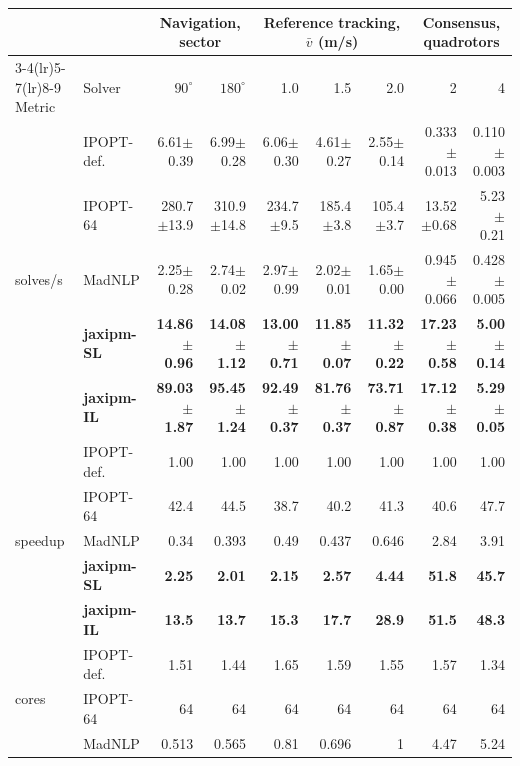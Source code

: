 \begin{table}[p]
\centering\setlength{\tabcolsep}{1.7pt}\renewcommand{\arraystretch}{0.94}
{\scriptsize
\begin{tabular}{@{}l l r r r r r r r@{}}
\toprule
& & \multicolumn{2}{c}{Navigation, sector} & \multicolumn{3}{c}{Reference tracking, $\bar{v}$ (m/s)} & \multicolumn{2}{c}{Consensus, quadrotors} \\
\cmidrule(lr){3-4}\cmidrule(lr){5-7}\cmidrule(lr){8-9}
Metric & Solver & $90^\circ$ & $180^\circ$ & 1.0 & 1.5 & 2.0 & 2 & 4 \\
\midrule
\multirow{5}{*}{solves/s} & IPOPT-def. & 6.61$\pm$0.39 & 6.99$\pm$0.28 & 6.06$\pm$0.30 & 4.61$\pm$0.27 & 2.55$\pm$0.14 & 0.333$\pm$0.013 & 0.110$\pm$0.003 \\
 & IPOPT-64 & 280.7$\pm$13.9 & 310.9$\pm$14.8 & 234.7$\pm$9.5 & 185.4$\pm$3.8 & 105.4$\pm$3.7 & 13.52$\pm$0.68 & 5.23$\pm$0.21 \\
 & MadNLP & 2.25$\pm$0.28 & 2.74$\pm$0.02 & 2.97$\pm$0.99 & 2.02$\pm$0.01 & 1.65$\pm$0.00 & 0.945$\pm$0.066 & 0.428$\pm$0.005 \\
 & \textbf{jaxipm-SL} & \textbf{14.86$\pm$0.96} & \textbf{14.08$\pm$1.12} & \textbf{13.00$\pm$0.71} & \textbf{11.85$\pm$0.07} & \textbf{11.32$\pm$0.22} & \textbf{17.23$\pm$0.58} & \textbf{5.00$\pm$0.14} \\
 & \textbf{jaxipm-IL} & \textbf{89.03$\pm$1.87} & \textbf{95.45$\pm$1.24} & \textbf{92.49$\pm$0.37} & \textbf{81.76$\pm$0.37} & \textbf{73.71$\pm$0.87} & \textbf{17.12$\pm$0.38} & \textbf{5.29$\pm$0.05} \\
\midrule
\multirow{5}{*}{speedup} & IPOPT-def. & 1.00 & 1.00 & 1.00 & 1.00 & 1.00 & 1.00 & 1.00 \\
 & IPOPT-64 & 42.4 & 44.5 & 38.7 & 40.2 & 41.3 & 40.6 & 47.7 \\
 & MadNLP & 0.34 & 0.393 & 0.49 & 0.437 & 0.646 & 2.84 & 3.91 \\
 & \textbf{jaxipm-SL} & \textbf{2.25} & \textbf{2.01} & \textbf{2.15} & \textbf{2.57} & \textbf{4.44} & \textbf{51.8} & \textbf{45.7} \\
 & \textbf{jaxipm-IL} & \textbf{13.5} & \textbf{13.7} & \textbf{15.3} & \textbf{17.7} & \textbf{28.9} & \textbf{51.5} & \textbf{48.3} \\
\midrule
\multirow{5}{*}{cores} & IPOPT-def. & 1.51 & 1.44 & 1.65 & 1.59 & 1.55 & 1.57 & 1.34 \\
 & IPOPT-64 & 64 & 64 & 64 & 64 & 64 & 64 & 64 \\
 & MadNLP & 0.513 & 0.565 & 0.81 & 0.696 & 1 & 4.47 & 5.24 \\

\end{tabular}}
\end{table}
